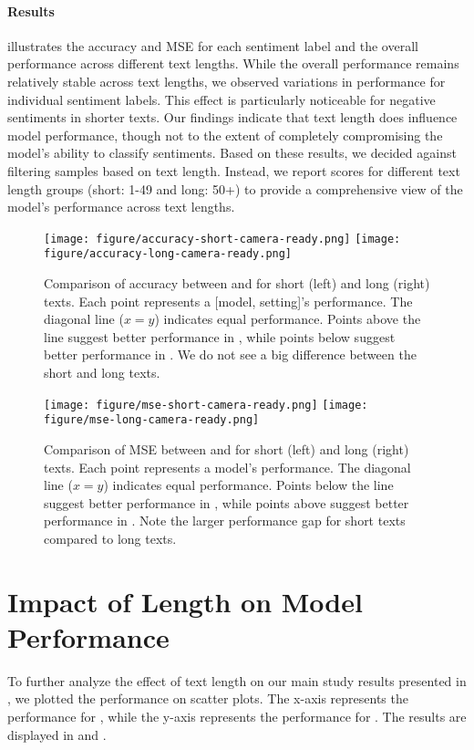 \paragraph{Results}
 illustrates the accuracy and MSE for each sentiment label and the overall performance across different text lengths.
While the overall performance remains relatively stable across text lengths, we observed variations in performance for individual sentiment labels.
This effect is particularly noticeable for negative sentiments in shorter texts.
Our findings indicate that text length does influence model performance, though not to the extent of completely compromising the model's ability to classify sentiments.
Based on these results, we decided against filtering samples based on text length.
Instead, we report scores for different text length groups (short: 1-49 and long: 50+) to provide a comprehensive view of the model's performance across text lengths.


\begin{figure*}
    \centering
    \texttt{[image: figure/accuracy-short-camera-ready.png]}
    \hfill
    \texttt{[image: figure/accuracy-long-camera-ready.png]}
    \caption{Comparison of accuracy between \cnChinese and \twChinese for short (left) and long (right) texts. Each point represents a [model, setting]'s performance. The diagonal line ($x=y$) indicates equal performance. Points above the line suggest better performance in \twChinese, while points below suggest better performance in \cnChinese. We do not see a big difference between the short and long texts.}
    \label{fig:main-lengh-analysis-accuracy}
\end{figure*}

\begin{figure*}
    \centering
    \texttt{[image: figure/mse-short-camera-ready.png]}
    \hfill
    \texttt{[image: figure/mse-long-camera-ready.png]}
    \caption{Comparison of MSE between \cnChinese and \twChinese for short (left) and long (right) texts. Each point represents a model's performance. The diagonal line ($x=y$) indicates equal performance. Points below the line suggest better performance in \twChinese, while points above suggest better performance in \cnChinese. Note the larger performance gap for short texts compared to long texts.}
    \label{fig:main-length-analysis-mse}
\end{figure*}

\section{Impact of Length on Model Performance\label{app:length-analysis-in-main-result}}
To further analyze the effect of text length on our main study results presented in ,
we plotted the performance on scatter plots.
The x-axis represents the performance for \cnChinese, while the y-axis represents the performance for \twChinese.
The results are displayed in  and .


